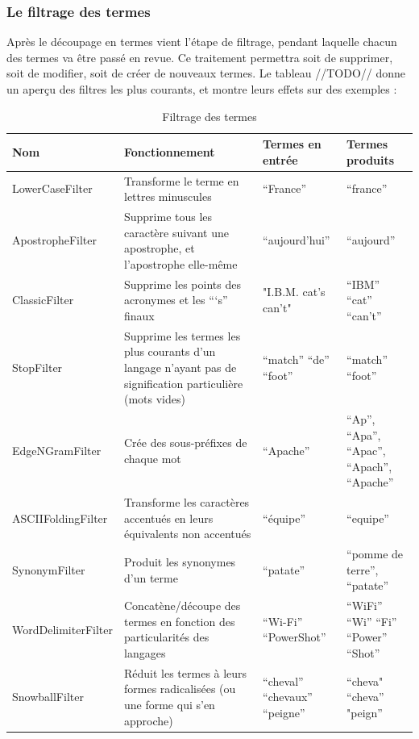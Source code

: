 \subsubsection{Le filtrage des termes}

Après le découpage en termes vient l’étape de filtrage, pendant laquelle chacun des termes va être passé en revue. Ce traitement permettra soit de supprimer, soit de modifier, soit de créer de nouveaux termes. Le tableau //TODO// donne un aperçu des filtres les plus courants, et montre leurs effets sur des exemples :

\begin{table}[!htbp]
                \centering
                \begin{tabular}{|p{3cm}|p{3cm}|p{3cm}|p{3cm}|}
                    \hline
                    \textbf{Nom} & \textbf{Fonctionnement} & \textbf{Termes en entrée} & \textbf{Termes produits}\\
                    \hline
LowerCaseFilter & Transforme le terme en lettres minuscules & “France” & “france”\\
\hline
ApostropheFilter & Supprime tous les caractère suivant une apostrophe, et l’apostrophe elle-même & “aujourd’hui” & “aujourd”\\
\hline
ClassicFilter & Supprime les points des acronymes et les “‘s” finaux & "I.B.M. cat's can't" & “IBM” “cat” “can’t”\\
\hline
StopFilter & Supprime les termes les plus courants d’un langage n’ayant pas de signification particulière (mots vides) & “match” “de” “foot” & “match” “foot”\\
\hline
EdgeNGramFilter & Crée des sous-préfixes de chaque mot & “Apache” & “Ap”, “Apa”, “Apac”, “Apach”, “Apache”\\
\hline
ASCIIFoldingFilter & Transforme les caractères accentués en leurs équivalents non accentués & “équipe” & “equipe”\\
\hline
SynonymFilter & Produit les synonymes d’un terme & “patate” & “pomme de terre”, “patate”\\
\hline
WordDelimiterFilter & Concatène/découpe des termes en fonction des particularités des langages & “Wi-Fi” “PowerShot” & “WiFi” “Wi” “Fi” “Power” “Shot”\\
\hline
SnowballFilter & Réduit les termes à leurs formes radicalisées (ou une forme qui s’en approche) & “cheval”  “chevaux”  “peigne” & “cheva" “cheva” "peign”\\
                    \hline

                \end{tabular}
                \caption{Filtrage des termes}
                \label{tab:filtrage_termes}
            \end{table}

